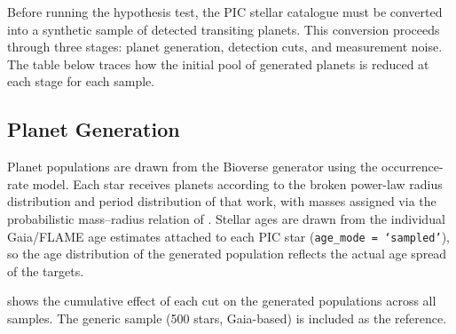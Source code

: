 Before running the \HZIED hypothesis test, the PIC stellar catalogue must
be converted into a synthetic sample of detected transiting planets.  This
conversion proceeds through three stages: planet generation, detection cuts,
and measurement noise.  The table below traces how the initial pool of
generated planets is reduced at each stage for each \PLATO sample.

\subsection{Planet Generation}
\label{ssec:planet_generation}

Planet populations are drawn from the Bioverse generator using the
\textcite{Bergsten2022} occurrence-rate model.  Each star receives planets
according to the broken power-law radius distribution and period
distribution of that work, with masses assigned via the probabilistic
mass--radius relation of \textcite{ChenKipping2017}.  Stellar ages are
drawn from the individual Gaia/FLAME age estimates attached to each PIC
star (\texttt{age\_mode = `sampled'}), so the age distribution of the
generated population reflects the actual age spread of the \PLATO targets.

 shows the cumulative effect of each cut on the
generated populations across all samples.  The generic sample (500 stars,
Gaia-based) is included as the \textcite{Schlecker2024} reference.

